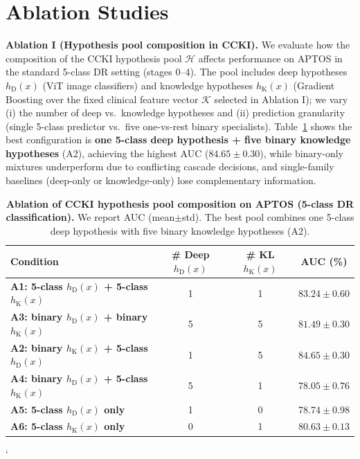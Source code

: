 \documentclass[runningheads]{llncs}
\begin{document}
\section{Ablation Studies}

\noindent\textbf{Ablation I (Hypothesis pool composition in CCKI).}
We evaluate how the composition of the CCKI hypothesis pool $\mathcal{H}$ affects performance on APTOS in the standard 5-class DR setting (stages 0--4). The pool includes deep hypotheses $h_{\mathrm{D}}(x)$ (ViT image classifiers) and knowledge hypotheses $h_{\mathrm{K}}(x)$ (Gradient Boosting over the fixed clinical feature vector $\mathcal{K}$ selected in Ablation I); we vary (i) the number of deep vs.\ knowledge hypotheses and (ii) prediction granularity (single 5-class predictor vs.\ five one-vs-rest binary specialists). Table~\ref{tab:aptos_ccki_ablation} shows the best configuration is \textbf{one 5-class deep hypothesis + five binary knowledge hypotheses} (A2), achieving the highest AUC ($84.65\pm0.30$), while binary-only mixtures underperform due to conflicting cascade decisions, and single-family baselines (deep-only or knowledge-only) lose complementary information.
\vspace{-4mm}
\begin{table}[!htbp]
\centering
\scriptsize
\captionsetup{font=scriptsize}
\setlength{\tabcolsep}{1pt}

\caption{\textbf{Ablation of CCKI hypothesis pool composition on APTOS (5-class DR classification).} We report AUC (mean$\pm$std). The best pool combines one 5-class deep hypothesis with five binary knowledge hypotheses (A2).}
\begin{tabular}{lccc}
\toprule
\textbf{Condition} &
\textbf{\# Deep $h_{\mathrm{D}}(x)$} &
\textbf{\# KL $h_{\mathrm{K}}(x)$} &
\textbf{AUC (\%)} \\
\midrule

\textbf{A1: 5-class $h_{\mathrm{D}}(x)$ + 5-class $h_{\mathrm{K}}(x)$} &
1 & 1 &
$83.24 \pm 0.60$ \\

\textbf{A3: binary $h_{\mathrm{D}}(x)$ + binary $h_{\mathrm{K}}(x)$} &
5 & 5 &
$81.49 \pm 0.30$ \\

\textbf{A2: binary $h_{\mathrm{K}}(x)$ + 5-class $h_{\mathrm{D}}(x)$} &
1 & 5 &
$\mathbf{84.65 \pm 0.30}$ \\

\textbf{A4: binary $h_{\mathrm{D}}(x)$ + 5-class $h_{\mathrm{K}}(x)$} &
5 & 1 &
$78.05 \pm 0.76$ \\

\textbf{A5: 5-class $h_{\mathrm{D}}(x)$ only} &
1 & 0 &
$78.74 \pm 0.98$ \\

\textbf{A6: 5-class $h_{\mathrm{K}}(x)$ only} &
0 & 1 &
$80.63 \pm 0.13$ \\

\bottomrule
\end{tabular}

\label{tab:aptos_ccki_ablation}

\end{table}`
\vspace{-2mm}
\end{document}

